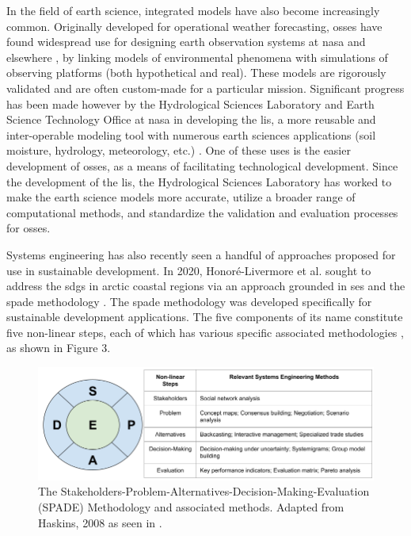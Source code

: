 In the field of earth science, integrated models have also become increasingly common. Originally developed for operational weather forecasting, \acp{osse} have found widespread use for designing earth observation systems at \ac{nasa} and elsewhere \cite{masutaniObservingSystemSimulation2010}, by linking models of environmental phenomena with simulations of observing platforms (both hypothetical and real). These models are rigorously validated \cite{erricoDevelopmentValidationObservingsystem2013} and are often custom-made for a particular mission. Significant progress has been made however by the  Hydrological Sciences Laboratory and Earth Science Technology Office at \ac{nasa} in developing the \ac{lis}, a more reusable and inter-operable modeling tool with numerous earth sciences applications (soil moisture, hydrology, meteorology, etc.) \cite{kumarMissionSimulationEvaluation2015}. One of these uses is the easier development of \acp{osse}, as a means of facilitating technological development. Since the development of the \ac{lis}, the Hydrological Sciences Laboratory has worked to make the earth science models more accurate, utilize  a broader range of computational methods, and standardize the validation and evaluation processes for \acp{osse}.

Systems engineering has also recently seen a handful of approaches proposed for use in sustainable development. In 2020, Honoré-Livermore et al. sought to address the \acp{sdg} in arctic coastal regions via an approach grounded in \ac{ses} and the \ac{spade} methodology \cite{honore-livermoreAddressingSustainableDevelopment2020}. The \ac{spade} methodology was developed specifically for sustainable development applications. The five components of its name constitute five non-linear steps, each of which has various specific associated methodologies \cite{haskinsSystemsEngineeringAnalyzed2008}, as shown in Figure 3.

\begin{figure}[h]
\centering
\includegraphics[scale=0.4]{Figures/chap3/spade.png}
\caption[The SPADE Methodology and associated methods]{The Stakeholders-Problem-Alternatives-Decision-Making-Evaluation (SPADE) Methodology and associated methods. Adapted from Haskins, 2008 \cite{haskinsSystemsEngineeringAnalyzed2008} as seen in \cite{reidSystemsEngineeringAppliedPendingPublication}.}
\label{fig:spade}
\end{figure}

